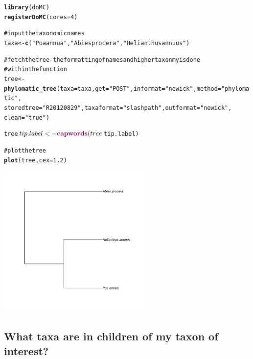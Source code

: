 \documentclass[letterpaper,superscriptaddress,showkeys,longbibliography]{revtex4-1}\usepackage{graphicx, color}
\makeatletter
\newcommand{\hlfunctioncall}[1]{\textcolor[rgb]{0.501960784313725,0,0.329411764705882}{\textbf{#1}}}%
\newcommand{\hlstring}[1]{\textcolor[rgb]{0.6,0.6,1}{#1}}%
\newcommand{\hlcomment}[1]{\textcolor[rgb]{0.180392156862745,0.6,0.341176470588235}{#1}}%
\newenvironment{kframe}{%
 \def\at@end@of@kframe{}%
 \ifinner\ifhmode%
  \def\at@end@of@kframe{\end{minipage}}%
  \begin{minipage}{\columnwidth}%
 \fi\fi%
 \def\FrameCommand##1{\hskip\@totalleftmargin \hskip-\fboxsep
 \colorbox{shadecolor}{##1}\hskip-\fboxsep
     \hskip-\linewidth \hskip-\@totalleftmargin \hskip\columnwidth}%
 \MakeFramed {\advance\hsize-\width
   \@totalleftmargin\z@ \linewidth\hsize
   \@setminipage}}%
 {\par\unskip\endMakeFramed%
 \at@end@of@kframe}
\newenvironment{knitrout}{}{} %
\makeatother
\begin{document}
\begin{knitrout}
\color{fgcolor}\begin{kframe}
\begin{alltt}
\hlfunctioncall{library}(doMC)
\hlfunctioncall{registerDoMC}(cores = 4)

\hlcomment{# input the taxonomic names}
taxa <- \hlfunctioncall{c}(\hlstring{"Poa annua"}, \hlstring{"Abies procera"}, \hlstring{"Helianthus annuus"})

\hlcomment{# fetch the tree - the formatting of names and higher taxonmy is done}
\hlcomment{# within the function}
tree <- \hlfunctioncall{phylomatic_tree}(taxa = taxa, get = \hlstring{"POST"}, informat = \hlstring{"newick"}, method = \hlstring{"phylomatic"}, 
    storedtree = \hlstring{"R20120829"}, taxaformat = \hlstring{"slashpath"}, outformat = \hlstring{"newick"}, 
    clean = \hlstring{"true"})

tree$tip.label <- \hlfunctioncall{capwords}(tree$tip.label)

\hlcomment{# plot the tree}
\hlfunctioncall{plot}(tree, cex = 1.2)
\end{alltt}
\end{kframe}

{\centering \includegraphics[width=.8\linewidth,height=3in]{figure/phylomaticphylogeny} 

}



\end{knitrout}


\subsection{What taxa are in children of my taxon of interest?}
\end{document}
